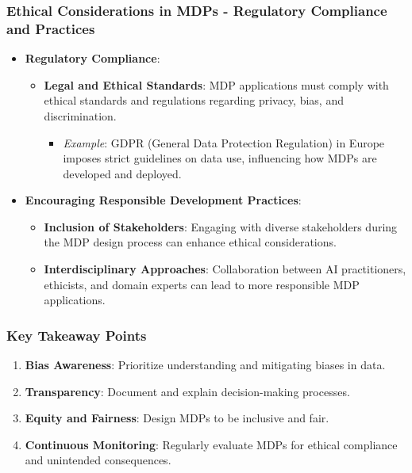 \documentclass[aspectratio=169]{beamer}
\begin{document}
\begin{frame}[fragile]
    \frametitle{Ethical Considerations in MDPs - Regulatory Compliance and Practices}
    \begin{itemize}
        \item \textbf{Regulatory Compliance}:
        \begin{itemize}
            \item \textbf{Legal and Ethical Standards}: MDP applications must comply with ethical standards and regulations regarding privacy, bias, and discrimination.
            \begin{itemize}
                \item \textit{Example}: GDPR (General Data Protection Regulation) in Europe imposes strict guidelines on data use, influencing how MDPs are developed and deployed.
            \end{itemize}
        \end{itemize}
        
        \item \textbf{Encouraging Responsible Development Practices}:
        \begin{itemize}
            \item \textbf{Inclusion of Stakeholders}: Engaging with diverse stakeholders during the MDP design process can enhance ethical considerations.
            \item \textbf{Interdisciplinary Approaches}: Collaboration between AI practitioners, ethicists, and domain experts can lead to more responsible MDP applications.
        \end{itemize}
    \end{itemize}
\end{frame}

\begin{frame}[fragile]
    \frametitle{Key Takeaway Points}
    \begin{enumerate}
        \item \textbf{Bias Awareness}: Prioritize understanding and mitigating biases in data.
        \item \textbf{Transparency}: Document and explain decision-making processes.
        \item \textbf{Equity and Fairness}: Design MDPs to be inclusive and fair.
        \item \textbf{Continuous Monitoring}: Regularly evaluate MDPs for ethical compliance and unintended consequences.
    \end{enumerate}
\end{frame}
\end{document}

